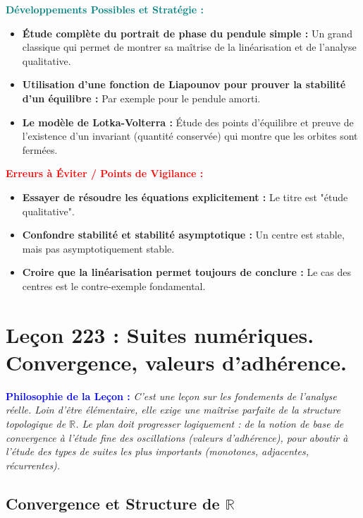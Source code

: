 \documentclass[12pt, a4paper, parskip=full]{report}
\theoremstyle{agregstyle}
\newenvironment{philosophie}
  {\par\medskip\noindent\begin{oframed}\noindent\textbf{\textcolor{blue}{Philosophie de la Leçon :}}\itshape}
  {\end{oframed}\par\medskip}
\newenvironment{developpements}
  {\par\medskip\noindent\begin{oframed}\noindent\textbf{\textcolor{teal}{Développements Possibles et Stratégie :}}}
  {\end{oframed}\par\medskip}
\newenvironment{erreurs}
  {\par\medskip\noindent\begin{oframed}\noindent\textbf{\textcolor{red}{Erreurs à Éviter / Points de Vigilance :}}}
  {\end{oframed}\par\medskip}
\begin{document}
\begin{developpements}
    \begin{itemize}
        \item \textbf{Étude complète du portrait de phase du pendule simple :} Un grand classique qui permet de montrer sa maîtrise de la linéarisation et de l'analyse qualitative.
        \item \textbf{Utilisation d'une fonction de Liapounov pour prouver la stabilité d'un équilibre :} Par exemple pour le pendule amorti.
        \item \textbf{Le modèle de Lotka-Volterra :} Étude des points d'équilibre et preuve de l'existence d'un invariant (quantité conservée) qui montre que les orbites sont fermées.
    \end{itemize}
\end{developpements}

\begin{erreurs}
    \begin{itemize}
        \item \textbf{Essayer de résoudre les équations explicitement :} Le titre est "étude qualitative".
        \item \textbf{Confondre stabilité et stabilité asymptotique :} Un centre est stable, mais pas asymptotiquement stable.
        \item \textbf{Croire que la linéarisation permet toujours de conclure :} Le cas des centres est le contre-exemple fondamental.
    \end{itemize}
\end{erreurs}
\chapter{Leçon 223 : Suites numériques. Convergence, valeurs d'adhérence.}

\begin{philosophie}
    C'est une leçon sur les fondements de l'analyse réelle. Loin d'être élémentaire, elle exige une maîtrise parfaite de la structure topologique de $\mathbb{R}$. Le plan doit progresser logiquement : de la notion de base de convergence à l'étude fine des oscillations (valeurs d'adhérence), pour aboutir à l'étude des types de suites les plus importants (monotones, adjacentes, récurrentes).
\end{philosophie}

\section{Convergence et Structure de $\mathbb{R}$}
\end{document}
